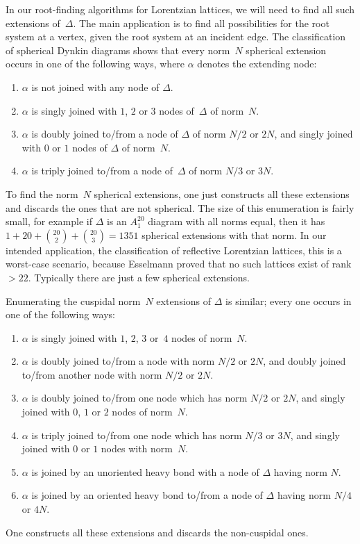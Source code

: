 \documentclass[12pt]{amsart}
\def\D{\Delta}
\numberwithin{theorem}{section}
\numberwithin{equation}{section}
\numberwithin{figure}{section}
\theoremstyle{remark}
\begin{document}
In our root-finding algorithms
for Lorentzian lattices, we will need to find all such
extensions of~$\D$.  The main application is to find all possibilities
for the root system at a vertex, given the root system
at an incident edge.
The classification of spherical Dynkin
diagrams shows that every norm~$N$ spherical 
extension occurs in one of the following ways,
where $\alpha$ denotes the extending node:
\begin{enumerate}
    \item
        $\alpha$ is not joined with any node of $\D$.
    \item
        $\alpha$ is singly joined with $1$, $2$ or $3$ nodes of~$\D$ of norm~$N$.
    \item
        $\alpha$ is doubly joined to/from a node of $\D$ of norm $N/2$ or $2N$, 
        and singly joined with $0$ or $1$ nodes of $\D$ of norm~$N$.
    \item
        $\alpha$ is triply joined to/from a node of~$\D$ of norm $N/3$ or $3N$.
\end{enumerate}
To find the norm~$N$ spherical extensions, one just constructs all these
extensions and discards the ones that are not spherical.  
The size of this enumeration is fairly small, for example if $\D$ is an $A_1^{20}$
diagram with all norms equal, then it has
$1+20+\binom{20}{2}+\binom{20}{3}=1351$ spherical extensions with that norm.
In our intended application,  the classification of reflective Lorentzian lattices, 
this is a worst-case scenario, because  Esselmann proved that no such lattices exist of rank${}>22$.
Typically there are just a few spherical extensions.

Enumerating
the cuspidal norm~$N$ extensions of $\D$ is similar; every one occurs in one
of the following ways:
\begin{enumerate}
    \item
        $\alpha$ is singly joined with $1$, $2$, $3$ or~$4$ nodes of norm~$N$.
    \item
        $\alpha$ is doubly joined to/from a node with norm $N/2$ or $2N$,
        and doubly joined to/from another node with norm $N/2$ or $2N$.
    \item
        $\alpha$ is doubly joined to/from one node which has norm $N/2$ or $2N$, and singly
        joined
        with $0$, $1$ or $2$ nodes of norm~$N$.
    \item
        $\alpha$ is triply joined to/from one node which has norm $N/3$ or $3N$, and singly
        joined with $0$ or $1$ nodes with norm~$N$.
    \item
        $\alpha$ is joined by an unoriented heavy bond with a node of $\D$ having norm $N$.
    \item
        $\alpha$ is joined by an oriented heavy bond to/from a node of $\D$ having norm $N/4$ or $4N$.
\end{enumerate}
One constructs all these extensions and discards the non-cuspidal ones.
\end{document}
